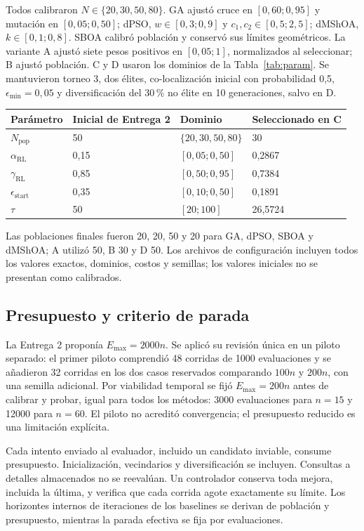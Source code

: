 \documentclass[11pt,a4paper]{article}
\newcommand{\Emax}{E_{\max}}
\begin{document}
Todos calibraron $N\in\{20,30,50,80\}$. GA ajustó cruce en $[0,60;0,95]$ y mutación en $[0,05;0,50]$; dPSO, $w\in[0,3;0,9]$ y $c_1,c_2\in[0,5;2,5]$; dMShOA, $k\in[0,1;0,8]$. SBOA calibró población y conservó sus límites geométricos. La variante A ajustó siete pesos positivos en $[0,05;1]$, normalizados al seleccionar; B ajustó población. C y D usaron los dominios de la Tabla~\ref{tab:param}. Se mantuvieron torneo 3, dos élites, co-localización inicial con probabilidad 0,5, $\epsilon_{\min}=0,05$ y diversificación del 30\,\% no élite en 10 generaciones, salvo en D.
\begin{center}\small
\begin{tabular}{@{}llll@{}}\toprule
Parámetro & Inicial de Entrega 2 & Dominio & Seleccionado en C\\\midrule
$N_{\mathrm{pop}}$ & 50 & $\{20,30,50,80\}$ & 30\\
$\alpha_{\mathrm{RL}}$ & 0,15 & $[0,05;0,50]$ & 0,2867\\
$\gamma_{\mathrm{RL}}$ & 0,85 & $[0,50;0,95]$ & 0,7384\\
$\epsilon_{\mathrm{start}}$ & 0,35 & $[0,10;0,50]$ & 0,1891\\
$\tau$ & 50 & $[20;100]$ & 26,5724\\\bottomrule
\end{tabular}
\label{tab:param}
\end{center}
Las poblaciones finales fueron 20, 20, 50 y 20 para GA, dPSO, SBOA y dMShOA; A utilizó 50, B 30 y D 50. Los archivos de configuración incluyen todos los valores exactos, dominios, costos y semillas; los valores iniciales no se presentan como calibrados.

\subsection{Presupuesto y criterio de parada}
La Entrega 2 proponía $\Emax=2000n$. Se aplicó su revisión única en un piloto separado: el primer piloto comprendió 48 corridas de 1000 evaluaciones y se añadieron 32 corridas en los dos casos reservados comparando $100n$ y $200n$, con una semilla adicional. Por viabilidad temporal se fijó $\Emax=200n$ antes de calibrar y probar, igual para todos los métodos: 3000 evaluaciones para $n=15$ y 12000 para $n=60$. El piloto no acreditó convergencia; el presupuesto reducido es una limitación explícita.

Cada intento enviado al evaluador, incluido un candidato inviable, consume presupuesto. Inicialización, vecindarios y diversificación se incluyen. Consultas a detalles almacenados no se reevalúan. Un controlador conserva toda mejora, incluida la última, y verifica que cada corrida agote exactamente su límite. Los horizontes internos de iteraciones de los baselines se derivan de población y presupuesto, mientras la parada efectiva se fija por evaluaciones.
\end{document}
